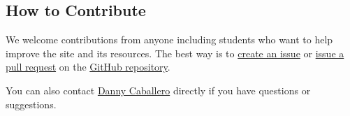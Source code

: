 \subsection{How to Contribute}\label{how-to-contribute}

We welcome contributions from anyone including students who want to help
improve the site and its resources. The best way is to
\href{https://github.com/dannycab/modern-classical-mechanics/issues}{create
an issue} or
\href{https://github.com/dannycab/modern-classical-mechanics/pulls}{issue
a pull request} on the
\href{https://github.com/dannycab/modern-classical-mechanics}{GitHub
repository}.

\href{https://github.com/dannycab/modern-classical-mechanics/issues}{}
\href{https://github.com/dannycab/modern-classical-mechanics/pulls}{}

You can also contact \href{https://dannycab.github.io/}{Danny Caballero}
directly if you have questions or suggestions.
